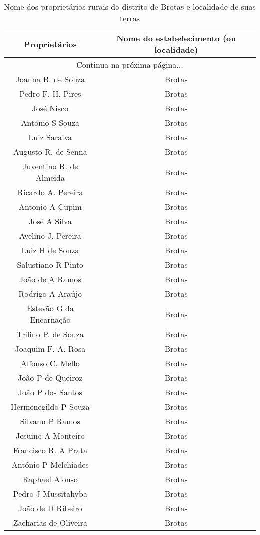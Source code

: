 \begin{tiny}
\begin{longtable}{c|c}
\caption{Nome dos proprietários rurais do distrito de Brotas e localidade de suas terras}\label{tab:proprurais}\\
\hline Proprietários & Nome do estabelecimento (ou localidade) \\ \hline \endhead
\hline \multicolumn{2}{c}{Continua na próxima página...} \\ \endfoot
\hline \endlastfoot
Joanna B. de Souza  & Brotas \\
Pedro F. H. Pires  & Brotas \\
José Nisco  & Brotas \\
António S Souza  & Brotas \\
Luiz Saraiva  & Brotas \\
Augusto R. de Senna  & Brotas \\
Juventino R. de Almeida  & Brotas \\
Ricardo A. Pereira  & Brotas \\
Antonio A Cupim & Brotas \\
José A Silva & Brotas \\
Avelino J. Pereira & Brotas \\
Luiz H de Souza & Brotas \\
Salustiano R Pinto & Brotas \\
João de A Ramos & Brotas \\
Rodrigo A Araújo & Brotas \\
Estevão G da Encarnação & Brotas \\
Trifino P. de Souza & Brotas \\
Joaquim F. A. Rosa & Brotas \\
Affonso C. Mello & Brotas \\
João P de Queiroz & Brotas \\
João P dos Santos & Brotas \\
Hermenegildo P Souza & Brotas \\
Silvann P Ramos & Brotas \\
Jesuino A Monteiro & Brotas \\
Francisco R. A Prata & Brotas \\
António P Melchiades & Brotas \\
Raphael Alonso & Brotas \\
Pedro J Mussitahyba & Brotas \\
João de D Ribeiro & Brotas \\
Zacharias de Oliveira & Brotas \\

\end{longtable}
\end{tiny}
